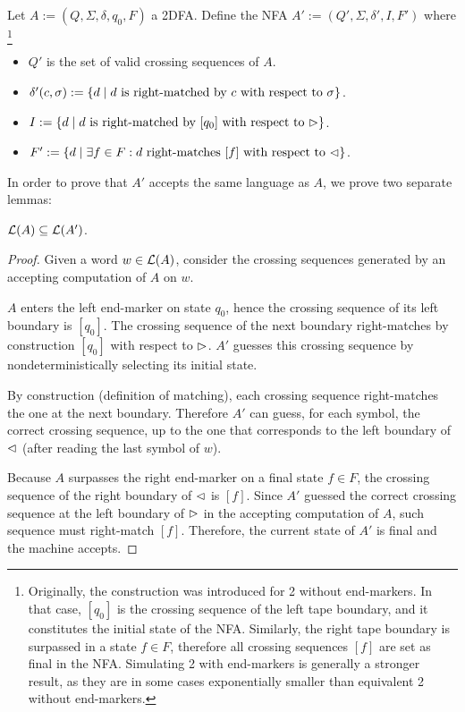 Let $A:=(Q,\Sigma,\delta,q_0,F)$ a 2DFA.
Define the NFA $A':=(Q',\Sigma,\delta',I,F')$ where%
\footnote{
	Originally, the construction was introduced for 2\DFAs{} without end-markers.
	In that case, $[q_0]$ is the crossing sequence of the left tape boundary, and it constitutes the initial state of the NFA.
	Similarly, the right tape boundary is surpassed in a state $f\in F$, therefore all crossing sequences $[f]$ are set as final in the NFA.
	Simulating 2\DFAs{} with end-markers is generally a stronger result, as they are in some cases exponentially smaller than equivalent 2\DFAs{} without end-markers.
}
\begin{itemize}
	\item $Q'$ is the set of valid crossing sequences of $A$.
	\item $\delta'(c,\sigma):=\{d \mid \text{$d$ is right-matched by $c$ with respect to $\sigma$}\}$.
	\item $I:=\{d\mid \text{$d$ is right-matched by $[q_0]$ with respect to $\rhd$}\}$.
	\item $F':=\{d\mid \exists f\in F: \text{$d$ right-matches $[f]$ with respect to $\lhd$}\}$.
\end{itemize}

In order to prove that $A'$ accepts the same language as $A$, we prove two separate lemmas:
\begin{lemm}\label{lem:2DFAto1NFA-1}
	$\mathcal L(A)\subseteq\mathcal L(A')$.
\end{lemm}
\begin{proof}
	Given a word $w\in\mathcal L(A)$, consider the crossing sequences generated by an accepting computation of $A$ on $w$.

	$A$ enters the left end-marker on state $q_0$, hence the crossing sequence of its left boundary is $[q_0]$.
	The crossing sequence of the next boundary right-matches by construction $[q_0]$ with respect to $\rhd$.
	$A'$ guesses this crossing sequence by nondeterministically selecting its initial state.

	By construction (definition of matching), each crossing sequence right-matches the one at the next boundary.
	Therefore $A'$ can guess, for each symbol, the correct crossing sequence, up to the one that corresponds to the left boundary of $\lhd$ (after reading the last symbol of $w$).

	Because $A$ surpasses the right end-marker on a final state $f\in F$, the crossing sequence of the right boundary of $\lhd$ is $[f]$.
	Since $A'$ guessed the correct crossing sequence at the left boundary of $\rhd$ in the accepting computation of $A$, such sequence must right-match $[f]$.
	Therefore, the current state of $A'$ is final and the machine accepts.
\end{proof}


